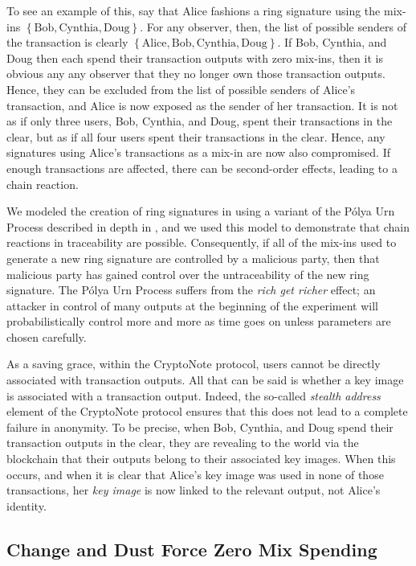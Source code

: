 \documentclass[12pt,english]{mrl}
\theoremstyle{definition}
\numberwithin{equation}{section}
\numberwithin{figure}{section}
\numberwithin{equation}{section}
\numberwithin{equation}{section}
\numberwithin{figure}{section}
\begin{document}
To see an example of this, say that Alice fashions a ring signature using the mix-ins $\left\{\text{Bob}, \text{Cynthia}, \text{Doug}\right\}$. For any observer, then, the list of possible senders of the transaction is clearly  $\left\{\text{Alice}, \text{Bob}, \text{Cynthia}, \text{Doug}\right\}$. If Bob, Cynthia, and Doug then each spend their transaction outputs with zero mix-ins, then it is obvious any any observer that they no longer own those transaction outputs. Hence, they can be excluded from the list of possible senders of Alice's transaction, and Alice is now exposed as the sender of her transaction. It is not as if only three users, Bob, Cynthia, and Doug,  spent their transactions in the clear, but as if all four users spent their transactions in the clear. Hence, any signatures using Alice's transactions as a mix-in are now also compromised. If enough transactions are affected, there can be second-order effects, leading to a chain reaction. 

We modeled the creation of ring signatures in \cite{chainReactions} using a variant of the P\'{o}lya Urn Process described in depth in \cite{johnson1977urn}, and we used this model to demonstrate that chain reactions in traceability are possible. Consequently, if all of the mix-ins used to generate a new ring signature are controlled by a malicious party, then that malicious party has gained control over the untraceability of the new ring signature. The P\'{o}lya Urn Process suffers from the \textit{rich get richer} effect; an attacker in control of many outputs at the beginning of the experiment will probabilistically control more and more as time goes on unless parameters are chosen carefully.

As a saving grace, within the CryptoNote protocol, users cannot be directly associated with transaction outputs. All that can be said is whether a key image is associated with a transaction output. Indeed, the so-called \textit{stealth address} element of the CryptoNote protocol ensures that this does not lead to a complete failure in anonymity.  To be precise, when Bob, Cynthia, and Doug spend their transaction outputs in the clear, they are revealing to the world via the blockchain that their outputs belong to their associated key images. When this occurs, and when it is clear that Alice's key image was used in none of those transactions, her \textit{key image} is now linked to the relevant output, not Alice's identity. 


\subsection{Change and Dust Force Zero Mix Spending}\label{changeAndDust}
\end{document}
